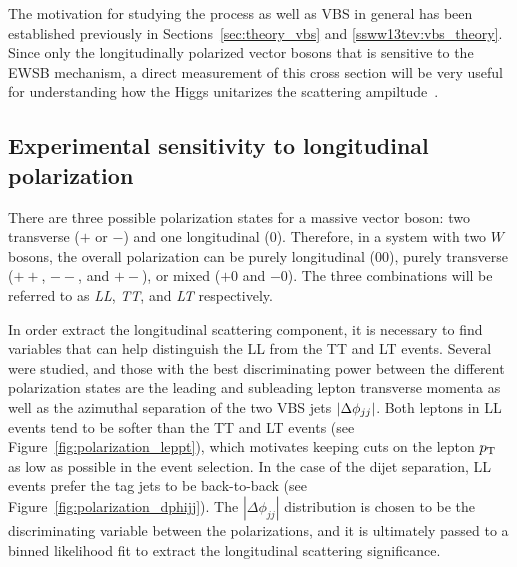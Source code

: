 The motivation for studying the \ssww process as well as VBS in general has been established previously in Sections~\ref{sec:theory_vbs} and \ref{ssww13tev:vbs_theory}.
Since only the longitudinally polarized vector bosons that is sensitive to the EWSB mechanism, a direct measurement of this cross section will be very useful for understanding how the Higgs unitarizes the scattering ampiltude~\cite{2013.longitudinal-theory}.

\subsection{Experimental sensitivity to longitudinal polarization}\label{sec:sswwupgrade_longitudinal_sens}

There are three possible polarization states for a massive vector boson: two transverse ($+$ or $-$) and one longitudinal ($0$).
Therefore, in a system with two $W$ bosons, the overall polarization can be purely longitudinal ($00$), purely transverse ($++$, $--$, and $+-$), or mixed ($+0$ and $-0$).
The three combinations will be referred to as \emph{LL}, \emph{TT}, and \emph{LT} respectively.

In order extract the longitudinal scattering component, it is necessary to find variables that can help distinguish the LL from the TT and LT events.
Several were studied, and those with the best discriminating power between the different polarization states are the leading and subleading lepton transverse momenta as well as the azimuthal separation of the two VBS jets $|\Delta\phi_{jj}|$.
Both leptons in LL events tend to be softer than the TT and LT events (see Figure~\ref{fig:polarization_leppt}), which motivates keeping cuts on the lepton $p_{\mathrm{T}}$ as low as possible in the event selection. %
In the case of the dijet separation, LL events prefer the tag jets to be back-to-back (see Figure~\ref{fig:polarization_dphijj}).
The $|\Delta\phi_{jj}|$ distribution is chosen to be the discriminating variable between the polarizations, and it is ultimately passed to a binned likelihood fit to extract the longitudinal scattering significance.

